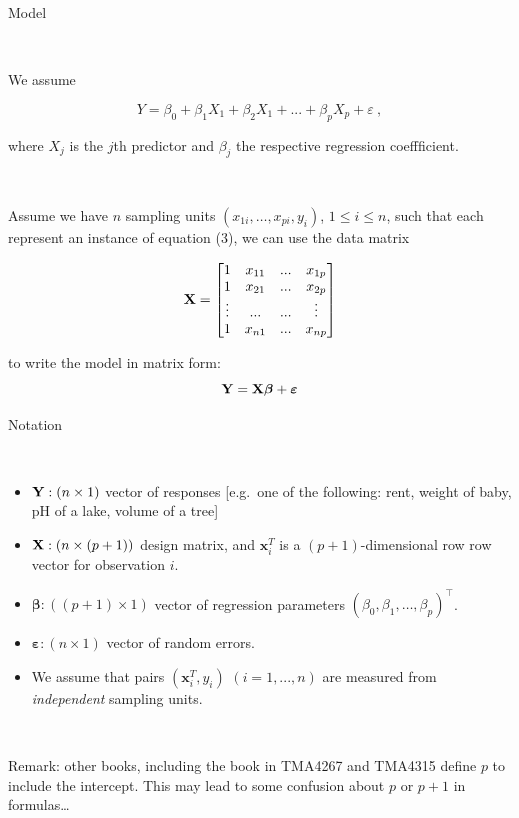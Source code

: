 \documentclass[10pt,ignorenonframetext,]{beamer}
\begin{document}
\begin{frame}

\begin{block}{Model}

\(~\)

We assume

\begin{equation}
Y = \beta_0 + \beta_{1}  X_1 + \beta_2 X_1 + ... + \beta_p X_p + \varepsilon \ ,
\end{equation}

where \(X_j\) is the \(j\)th predictor and \(\beta_j\) the respective
regression coeffficient.

\(~\)

Assume we have \(n\) sampling units \((x_{1i},\ldots,x_{pi}, y_i)\),
\(1\leq i \leq n\), such that each represent an instance of equation
(3), we can use the data matrix

\[{\bf{X}} = \left[\begin{matrix} 1 & x_{11} & ... & x_{1p} \\
1 & x_{21} & ... & x_{2p} \\
\vdots  & ... & ... & \vdots \\
1 & x_{n1} & ... & x_{np} \\
\end{matrix}\right]\]

to write the model in matrix form:
\[{\bf Y}={\bf {X}} \boldsymbol{\beta}+{\boldsymbol{\varepsilon}} \]

\end{block}

\end{frame}

\begin{frame}

\begin{block}{Notation}

\(~\)

\begin{itemize}
\item
  \({\bf Y}: (n \times 1)\) vector of responses {[}e.g.~one of the
  following: rent, weight of baby, pH of a lake, volume of a tree{]}
\item
  \({\bf X}: (n \times (p+1))\) design matrix, and
  \({\boldsymbol x}_i^T\) is a \((p+1)\)-dimensional row row vector for
  observation \(i\).
\item
  \({\boldsymbol \beta}: ((p+1) \times 1)\) vector of regression
  parameters \((\beta_0,\beta_1,\ldots,\beta_p)^\top\).
\item
  \({\boldsymbol \varepsilon}: (n\times 1)\) vector of random errors.
\item
  We assume that pairs \(({\boldsymbol x}_i^T,y_i)\) \((i=1,...,n)\) are
  measured from \emph{independent} sampling units.
\end{itemize}

\(~\)

Remark: other books, including the book in TMA4267 and TMA4315 define
\(p\) to include the intercept. This may lead to some confusion about
\(p\) or \(p+1\) in formulas\ldots{}

\end{block}

\end{frame}
\end{document}
